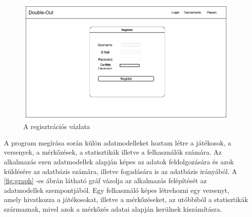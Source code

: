\begin{figure}[h]
\centering
\includegraphics[scale=0.5]{images/Register.png}
\caption{A regisztrációs vázlata}
\label{fig:register}
\end{figure}

A program megírása során külön adatmodelleket hoztam létre a játékosok, a versenyek, a mérkőzések, a statisztikák illetve a felhasználók számára. Az alkalmazás ezen adatmodellek alapján képes az adatok feldolgozására és azok küldésére az adatbázis számára, illetve fogadására is az adatbázis irányából. A \ref{fig:graph} -es ábrán látható gráf vázolja az alkalmazás felépítését az adatmodellek szempontjából. Egy felhasználó képes létrehozni egy versenyt, amely hivatkozza a játékosokat, illetve a mérkőzéseket, az utóbbiból a statisztikák származnak, mivel azok a mérkőzés adatai alapján kerülnek kiszámításra.

